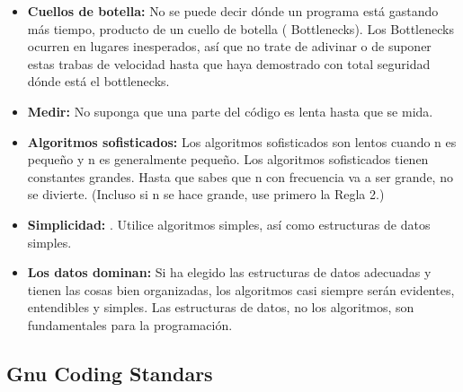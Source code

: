 \begin{itemize}
\item\textbf{Cuellos de botella:}
{No se puede decir dónde un programa está  gastando más tiempo, producto de un cuello de botella ( Bottlenecks). Los Bottlenecks ocurren en lugares inesperados, así que no trate de adivinar o de suponer estas trabas de velocidad hasta que haya demostrado con total seguridad dónde está el bottlenecks.}

\item\textbf{Medir:}
{No suponga que una parte del código es lenta hasta que se mida.}

\item\textbf{Algoritmos sofisticados:}
{Los algoritmos sofisticados son lentos cuando n es pequeño y n es generalmente pequeño. Los algoritmos sofisticados tienen constantes grandes. Hasta que sabes que n con frecuencia va a ser grande, no se divierte. (Incluso si n se hace grande, use primero la Regla 2.)}

\item\textbf{Simplicidad:}
{. Utilice algoritmos simples, así como estructuras de datos simples.}

\item\textbf{Los datos dominan:}
{Si ha elegido las estructuras de datos adecuadas y tienen las cosas bien organizadas, los algoritmos casi siempre serán evidentes, entendibles y simples. Las estructuras de datos, no los algoritmos, son fundamentales para la programación.}
\end{itemize}


\subsection{Gnu Coding Standars}

